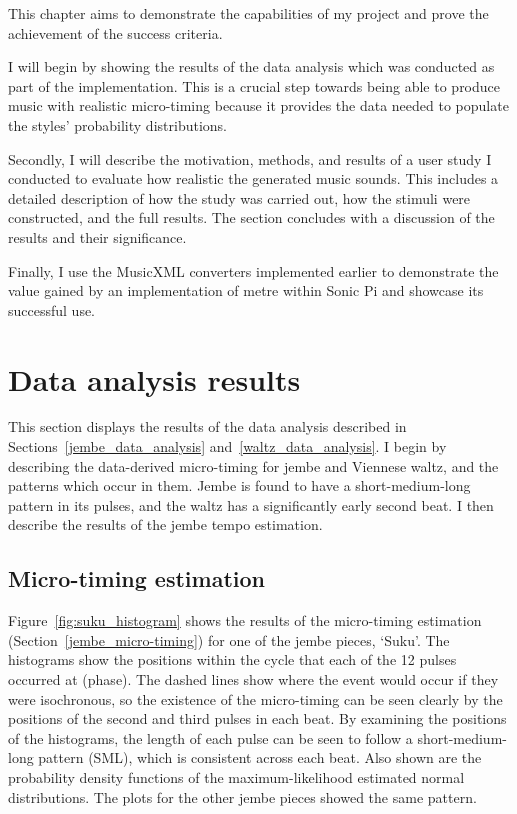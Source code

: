 \documentclass[12pt,twoside,openright]{report}
\begin{document}
This chapter aims to demonstrate the capabilities of my project and prove the
achievement of the success criteria.

I will begin by showing the results of the
data analysis which was conducted as part of the implementation. This is a
crucial step towards being able to produce music with realistic micro-timing
because it provides the data needed to populate the styles' probability
distributions.

Secondly, I will describe the motivation, methods, and results of
a user study I conducted to evaluate how realistic the generated music sounds.
This includes a detailed description of how the study was carried out, how the
stimuli were constructed, and the full results. The section concludes with a
discussion of the results and their significance.

Finally, I use the MusicXML
converters implemented earlier to demonstrate the value gained by an
implementation of metre within Sonic Pi and showcase its successful use.



\section{Data analysis results} \label{data_analysis_results}

This section displays the results of the data analysis described in Sections~\ref{jembe_data_analysis} and~\ref{waltz_data_analysis}. I
begin by describing the data-derived micro-timing for jembe and Viennese waltz,
and the patterns which occur in them. Jembe is found to have a short-medium-long
pattern in its pulses, and the waltz has a significantly early second beat. I
then describe the results of the jembe tempo estimation.


\subsection{Micro-timing estimation} \label{micro-timing_estimation_results}

Figure~\ref{fig:suku_histogram} shows the results of the micro-timing estimation (Section~\ref{jembe_micro-timing}) for one of
the jembe pieces, `Suku'. The histograms show the positions within the cycle
that each of the 12 pulses occurred at (phase). The dashed lines show where the
event would occur if they were isochronous, so the existence of the micro-timing
can be seen clearly by the positions of the second and third pulses in each beat.
By examining the positions of the histograms, the length of each pulse can be
seen to follow a short-medium-long pattern (SML), which is consistent across
each beat. Also shown are the probability density functions of the
maximum-likelihood estimated normal distributions. The plots for
the other jembe pieces showed the same pattern.
\end{document}
